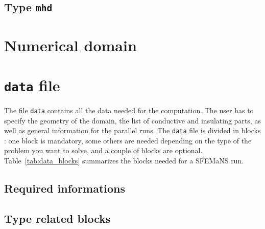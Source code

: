 \documentclass{book}
\makeatletter
\newcommand{\sfemans}{SFEMaNS\@\xspace}\newcommand{\petsc}{PETSc\@\xspace}
\makeatother
\begin{document}
\subsection{Type \texttt{mhd}}
\section{Numerical domain}
\section{\texttt{data} file}
The file \texttt{data} contains all the data needed for the
computation. The user has to specify the geometry of the domain, the
list of conductive and insulating parts, as well as general
information for the parallel runs. The \texttt{data} file is divided
in blocks : one block is mandatory, some others are needed depending
on the type of the problem you want to solve, and a couple of blocks
are optional. Table~\ref{tab:data_blocks} summarizes the blocks needed
for a \sfemans run.
\subsection{Required informations}
\subsection{Type related blocks}
\end{document}
